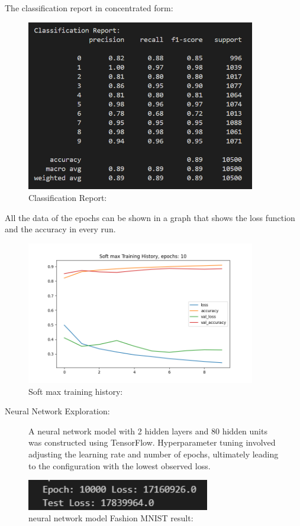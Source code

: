 \documentclass{article}
\begin{document}
The classification report in concentrated form:
\begin{figure}[H]
    \caption{Classification Report:}
    \centering
    \includegraphics[width=10cm]{imgFolder/classificationReportSoftmax.png}
\end{figure}

All the data of the epochs can be shown in a graph that shows the loss function and the accuracy in every run.
\begin{figure}[H]
    \caption{Soft max training history:}
    \centering
    \includegraphics[width=10cm]{softmax.png}
\end{figure}

Neural Network Exploration:

\begin{figure}[H]
    A neural network model with 2 hidden layers and 80 hidden units was constructed using TensorFlow. Hyperparameter tuning involved adjusting the learning rate and number of epochs, ultimately leading to the configuration with the lowest observed loss.
    \caption{neural network model Fashion MNIST result:}
    \centering
    \includegraphics[width=8cm]{imgFolder/neuronNetworkFlight.png}
\end{figure}
\end{document}
